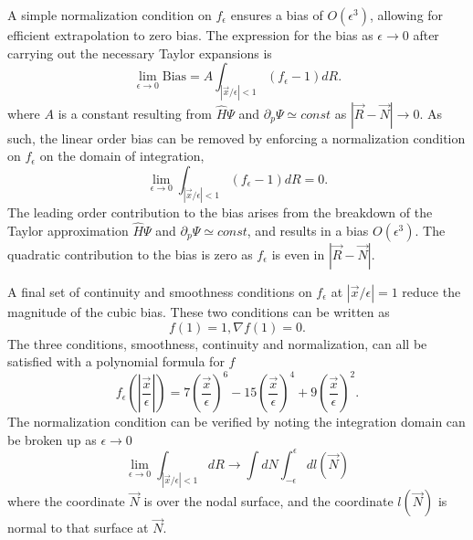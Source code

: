\documentclass[twocolumn]{revtex4-1}
\begin{document}
A simple normalization condition on $f_\epsilon$ ensures a bias of $O(\epsilon^3)$, allowing for efficient extrapolation to zero bias.
The expression for the bias as $\epsilon \rightarrow 0$ after carrying out the necessary Taylor expansions is
$$
\lim_{\epsilon\rightarrow 0}\text{Bias} =  A \int_{|\vec{x}/\epsilon|< 1} (f_\epsilon - 1) dR.
$$
where $A$ is a constant resulting from $\hat{H}\Psi$ and $\partial_p \Psi \simeq const$ as $|\vec{R}-\vec{N}|\rightarrow 0$.
As such, the linear order bias can be removed by enforcing a normalization condition on $f_\epsilon$ on the domain of integration, 
$$
\lim_{\epsilon\rightarrow 0} \int_{|\vec{x}/\epsilon|< 1} (f_\epsilon - 1) dR = 0.
$$
The leading order contribution to the bias arises from the breakdown of the Taylor approximation $\hat{H}\Psi$ and $\partial_p \Psi \simeq const$, and results in a bias $O(\epsilon^3)$.
The quadratic contribution to the bias is zero as $f_\epsilon$ is even in $|\vec{R}-\vec{N}|$.

A final set of continuity and smoothness conditions on $f_\epsilon$ at $|\vec{x}/\epsilon| = 1$ reduce the magnitude of the cubic bias.
These two conditions can be written as 
$$
f(1) = 1, \nabla f(1) = 0.
$$
The three conditions, smoothness, continuity and normalization, can all be satisfied with a polynomial formula for $f$
$$
f_\epsilon(|\frac{\vec{x}}{\epsilon}|) = 7(\frac{\vec{x}}{\epsilon})^6 - 15(\frac{\vec{x}}{\epsilon})^4 + 9(\frac{\vec{x}}{\epsilon})^2.
$$
The normalization condition can be verified by noting the integration domain can be broken up as $\epsilon \rightarrow 0$
$$
\lim_{\epsilon\rightarrow 0} \int_{|\vec{x}/\epsilon|< 1}  dR  \rightarrow \int dN \int_{-\epsilon}^{\epsilon} dl(\vec{N})
$$
where the coordinate $\vec{N}$ is over the nodal surface, and the coordinate $l(\vec{N})$ is normal to that surface at $\vec{N}$.
\end{document}
